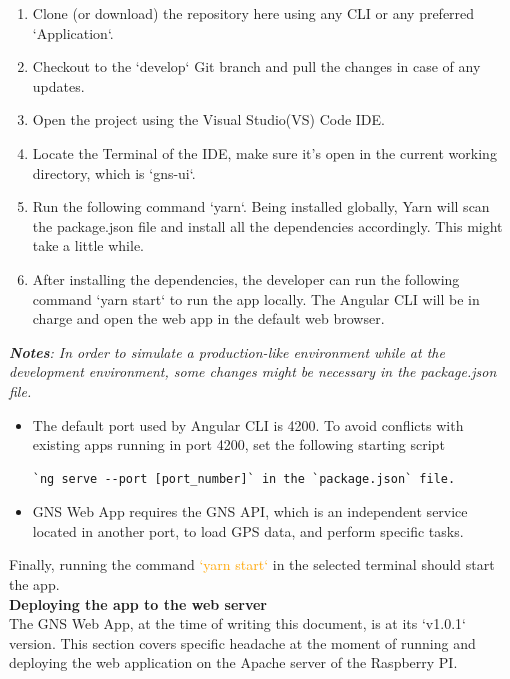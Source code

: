 \begin{enumerate}
    \item Clone (or download) the repository here using any CLI or any preferred `Application`.
    \item Checkout to the `develop` Git branch and pull the changes in case of any updates.
    \item Open the project using the Visual Studio(VS) Code IDE.
    \item Locate the Terminal of the IDE, make sure it's open in the current working directory, which is `gns-ui`.
    \item Run the following command `yarn`. Being installed globally, Yarn will scan the package.json file and install all the dependencies accordingly. This might take a little while.
    \item After installing the dependencies, the developer can run the following command `yarn start` to run the app locally. The Angular CLI will be in charge and open the web app in the default web browser.
\end{enumerate}

\noindent
\textit{\textbf{Notes}: In order to simulate a production-like environment while at the development environment, some changes might be necessary in the package.json file.}\\

\begin{itemize}
\item The default port used by Angular CLI is 4200. To avoid conflicts with existing apps running in port 4200, set the following starting script \begin{verbatim}`ng serve --port [port_number]` in the `package.json` file.\end{verbatim}
    \item GNS Web App requires the GNS API, which is an independent service located in another port, to load GPS data, and perform specific tasks.
\end{itemize}

Finally, running  the command \textcolor{orange}{`yarn start`} in the selected terminal should start the app.\\

\noindent
\textbf{Deploying the app to the web server}\\

\noindent
The GNS Web App, at the time of writing this document, is at its `v1.0.1` version. This section covers specific headache at the moment of running and deploying the web application on the Apache server of the Raspberry PI.

